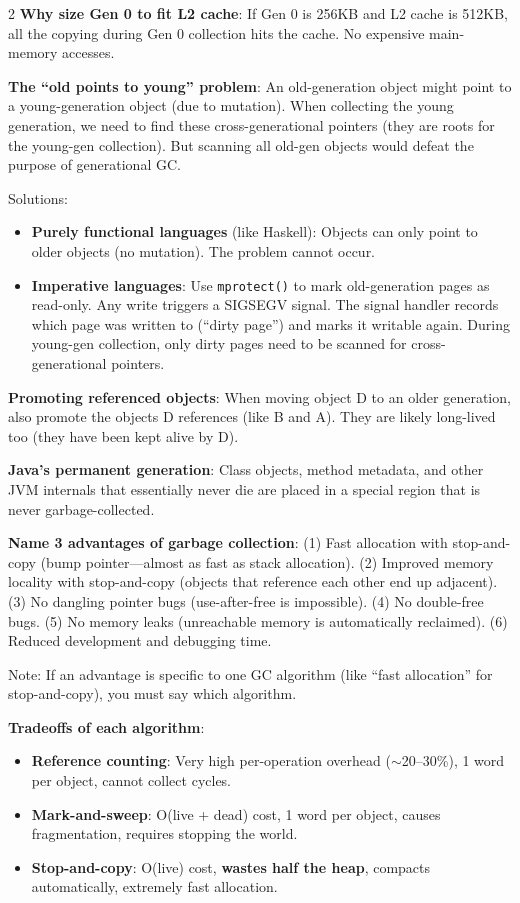 \documentclass[9pt,landscape]{extarticle}
\begin{document}
\begin{multicols}{2}
\textbf{Why size Gen 0 to fit L2 cache}: If Gen 0 is 256KB and L2 cache is 512KB, all the copying during Gen 0 collection hits the cache. No expensive main-memory accesses.

\textbf{The ``old points to young'' problem}: An old-generation object might point to a young-generation object (due to mutation). When collecting the young generation, we need to find these cross-generational pointers (they are roots for the young-gen collection). But scanning all old-gen objects would defeat the purpose of generational GC.

Solutions:
\begin{itemize}
  \item \textbf{Purely functional languages} (like Haskell): Objects can only point to older objects (no mutation). The problem cannot occur.
  \item \textbf{Imperative languages}: Use \texttt{mprotect()} to mark old-generation pages as read-only. Any write triggers a SIGSEGV signal. The signal handler records which page was written to (``dirty page'') and marks it writable again. During young-gen collection, only dirty pages need to be scanned for cross-generational pointers.
\end{itemize}

\textbf{Promoting referenced objects}: When moving object D to an older generation, also promote the objects D references (like B and A). They are likely long-lived too (they have been kept alive by D).

\textbf{Java's permanent generation}: Class objects, method metadata, and other JVM internals that essentially never die are placed in a special region that is never garbage-collected.

\begin{exambox}
\textbf{Name 3 advantages of garbage collection}: (1) Fast allocation with stop-and-copy (bump pointer---almost as fast as stack allocation). (2) Improved memory locality with stop-and-copy (objects that reference each other end up adjacent). (3) No dangling pointer bugs (use-after-free is impossible). (4) No double-free bugs. (5) No memory leaks (unreachable memory is automatically reclaimed). (6) Reduced development and debugging time.

Note: If an advantage is specific to one GC algorithm (like ``fast allocation'' for stop-and-copy), you must say which algorithm.

\textbf{Tradeoffs of each algorithm}:
\begin{itemize}
  \item \textbf{Reference counting}: Very high per-operation overhead ($\sim$20--30\%), 1 word per object, cannot collect cycles.
  \item \textbf{Mark-and-sweep}: O(live + dead) cost, 1 word per object, causes fragmentation, requires stopping the world.
  \item \textbf{Stop-and-copy}: O(live) cost, \textbf{wastes half the heap}, compacts automatically, extremely fast allocation.
\end{itemize}


\end{exambox}
\end{multicols}
\end{document}

